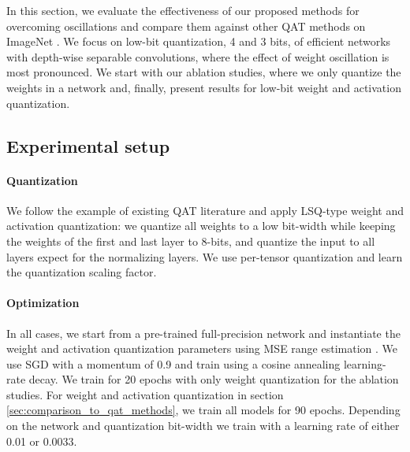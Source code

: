 In this section, we evaluate the effectiveness of our proposed methods for overcoming oscillations and compare them against other QAT methods on ImageNet \citep{imagenet}. We focus on low-bit quantization, 4 and 3 bits, of efficient networks with depth-wise separable convolutions, where the effect of weight oscillation is most pronounced. We start with our ablation studies, where we only quantize the weights in a network and, finally, present results for low-bit weight and activation quantization.

\subsection{Experimental setup}



\label{sec:experimentalconv.3.1_setup}


\paragraph{Quantization}
We follow the example of existing QAT literature and apply LSQ-type \citep{lsq} weight and activation quantization: we quantize all weights to a low bit-width while keeping the weights of the first and last layer to 8-bits, and quantize the input to all layers expect for the normalizing layers. We use per-tensor quantization \cite{krishnamoorthi} and learn the quantization scaling factor.

\paragraph{Optimization}
In all cases, we start from a pre-trained full-precision network and instantiate the weight and activation quantization parameters using MSE range estimation \citep{whitepaper}. We use SGD with a momentum of 0.9 and train using a cosine annealing learning-rate decay. We train for 20 epochs with only weight quantization for the ablation studies. For weight and activation quantization in section \ref{sec:comparison_to_qat_methods}, we train all models for 90 epochs. Depending on the network and quantization bit-width we train with a learning rate of either 0.01 or 0.0033. 


